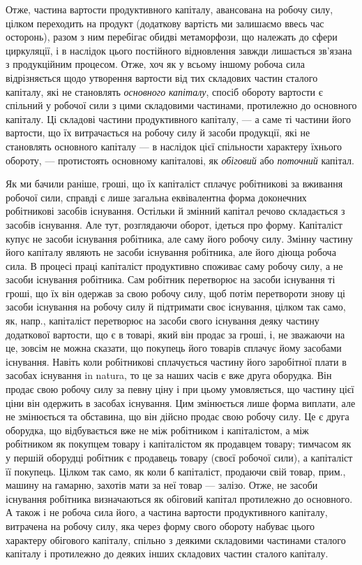 Отже, частина вартости продуктивного капіталу, авансована на робочу силу, цілком переходить на
продукт (додаткову вартість ми залишаємо ввесь час осторонь), разом з ним перебігає обидві
метаморфози, що належать до сфери циркуляції, і в наслідок цього постійного відновлення завжди
лишається зв’язана з продукційним процесом. Отже, хоч як у всьому іншому робоча сила відрізняється
щодо утворення вартости від тих складових частин сталого капіталу, які не становлять \emph{основного}
\emph{капіталу}, спосіб обороту вартости є спільний у робочої сили з цими складовими частинами,
протилежно до основного капіталу. Ці складові частини продуктивного капіталу, — а саме ті частини
його вартости, що їх витрачається на робочу силу й засоби продукції, які не становлять основного
капіталу — в наслідок цієї спільности характеру їхнього обороту, — протистоять основному капіталові,
як \emph{обіговий} або \emph{поточний} капітал.

Як ми бачили раніше, гроші, що їх капіталіст сплачує робітникові за вживання робочої сили, справді є
лише загальна еквівалентна форма доконечних робітникові засобів існування. Остільки й змінний
капітал речово складається з засобів існування. Але тут, розглядаючи оборот, ідеться про форму.
Капіталіст купує не засоби існування робітника, але саму його робочу силу. Змінну частину його
капіталу являють не засоби існування робітника, але його діюща робоча сила. В процесі праці
капіталіст продуктивно споживає саму робочу силу, а не засоби існування робітника. Сам робітник
перетворює на засоби існування ті гроші, що їх він одержав за свою робочу силу, щоб потім
перетвороти знову ці засоби існування на робочу силу й підтримати своє існування, цілком так само,
як, напр., капіталіст перетворює на засоби свого існування деяку частину додаткової вартости, що є в
товарі, який він продає за гроші, і, не зважаючи на це, зовсім не можна сказати, що покупець його
товарів сплачує йому засобами існування. Навіть коли робітникові сплачується частину його заробітної
плати в засобах існування in natura, то це за наших часів є вже друга оборудка. Він продає свою
робочу силу за певну ціну і при цьому умовляється, що частину цієї ціни він одержить в засобах
існування. Цим змінюється лише форма виплати, але не змінюється та обставина, що він дійсно продає
свою робочу силу. Це є друга оборудка, що відбувається вже не між робітником і капіталістом, а між
робітником як покупцем товару і капіталістом як продавцем товару; тимчасом як у першій оборудці
робітник є продавець товару (своєї робочої сили), а капіталіст її покупець. Цілком так само, як коли
б капіталіст, продаючи свій товар, прим., машину на гамарню, захотів мати за неї товар — залізо.
Отже, не засоби існування робітника визначаються як обіговий капітал протилежно до основного. А
також і не робоча сила його, а частина вартости продуктивного капіталу, витрачена на робочу силу,
яка через форму свого обороту набуває цього характеру обігового капіталу, спільно з деякими
складовими частинами сталого капіталу і протилежно до деяких інших складових частин сталого
капіталу.


